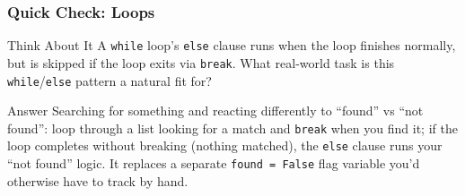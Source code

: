 \begin{frame}[fragile]\frametitle{Quick Check: Loops}
\begin{block}{Think About It}
A \texttt{while} loop's \texttt{else} clause runs when the loop finishes normally, but is skipped if the loop exits via \texttt{break}. What real-world task is this \texttt{while}/\texttt{else} pattern a natural fit for?
\end{block}
\pause
\begin{block}{Answer}
Searching for something and reacting differently to ``found'' vs ``not found'': loop through a list looking for a match and \texttt{break} when you find it; if the loop completes without breaking (nothing matched), the \texttt{else} clause runs your ``not found'' logic. It replaces a separate \texttt{found = False} flag variable you'd otherwise have to track by hand.
\end{block}
\end{frame}

	




	
